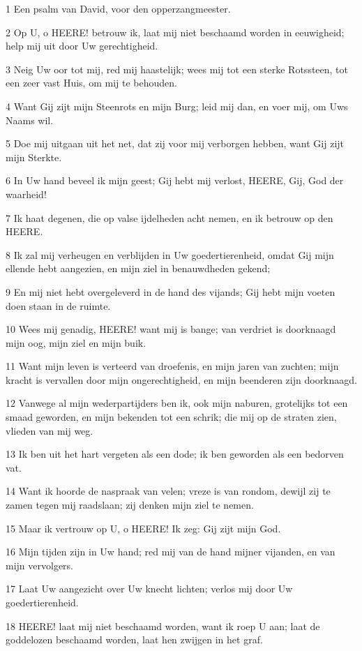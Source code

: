 \par 1 Een psalm van David, voor den opperzangmeester.
\par 2 Op U, o HEERE! betrouw ik, laat mij niet beschaamd worden in eeuwigheid; help mij uit door Uw gerechtigheid.
\par 3 Neig Uw oor tot mij, red mij haastelijk; wees mij tot een sterke Rotssteen, tot een zeer vast Huis, om mij te behouden.
\par 4 Want Gij zijt mijn Steenrots en mijn Burg; leid mij dan, en voer mij, om Uws Naams wil.
\par 5 Doe mij uitgaan uit het net, dat zij voor mij verborgen hebben, want Gij zijt mijn Sterkte.
\par 6 In Uw hand beveel ik mijn geest; Gij hebt mij verlost, HEERE, Gij, God der waarheid!
\par 7 Ik haat degenen, die op valse ijdelheden acht nemen, en ik betrouw op den HEERE.
\par 8 Ik zal mij verheugen en verblijden in Uw goedertierenheid, omdat Gij mijn ellende hebt aangezien, en mijn ziel in benauwdheden gekend;
\par 9 En mij niet hebt overgeleverd in de hand des vijands; Gij hebt mijn voeten doen staan in de ruimte.
\par 10 Wees mij genadig, HEERE! want mij is bange; van verdriet is doorknaagd mijn oog, mijn ziel en mijn buik.
\par 11 Want mijn leven is verteerd van droefenis, en mijn jaren van zuchten; mijn kracht is vervallen door mijn ongerechtigheid, en mijn beenderen zijn doorknaagd.
\par 12 Vanwege al mijn wederpartijders ben ik, ook mijn naburen, grotelijks tot een smaad geworden, en mijn bekenden tot een schrik; die mij op de straten zien, vlieden van mij weg.
\par 13 Ik ben uit het hart vergeten als een dode; ik ben geworden als een bedorven vat.
\par 14 Want ik hoorde de naspraak van velen; vreze is van rondom, dewijl zij te zamen tegen mij raadslaan; zij denken mijn ziel te nemen.
\par 15 Maar ik vertrouw op U, o HEERE! Ik zeg: Gij zijt mijn God.
\par 16 Mijn tijden zijn in Uw hand; red mij van de hand mijner vijanden, en van mijn vervolgers.
\par 17 Laat Uw aangezicht over Uw knecht lichten; verlos mij door Uw goedertierenheid.
\par 18 HEERE! laat mij niet beschaamd worden, want ik roep U aan; laat de goddelozen beschaamd worden, laat hen zwijgen in het graf.
